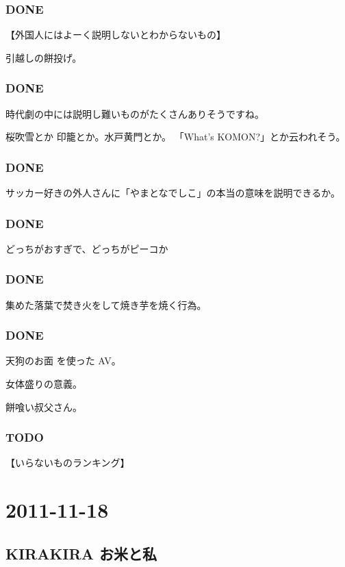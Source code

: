 \documentclass[11pt]{article}
\begin{document}
\subsubsection{\textbf{DONE}}
\label{sec-34_1_2}

【外国人にはよーく説明しないとわからないもの】

引越しの餅投げ。
\subsubsection{\textbf{DONE}}
\label{sec-34_1_3}

時代劇の中には説明し難いものがたくさんありそうですね。

桜吹雪とか
印籠とか。水戸黄門とか。
「What's KOMON?」とか云われそう。
\subsubsection{\textbf{DONE}}
\label{sec-34_1_4}

サッカー好きの外人さんに「やまとなでしこ」の本当の意味を説明できるか。
\subsubsection{\textbf{DONE}}
\label{sec-34_1_5}

どっちがおすぎで、どっちがピーコか
\subsubsection{\textbf{DONE}}
\label{sec-34_1_6}

集めた落葉で焚き火をして焼き芋を焼く行為。
\subsubsection{\textbf{DONE}}
\label{sec-34_1_7}

天狗のお面 を使った AV。

女体盛りの意義。

餅喰い叔父さん。
\subsubsection{\textbf{TODO}}
\label{sec-34_1_8}

【いらないものランキング】
\section{2011-11-18}
\label{sec-35}
\subsection{KIRAKIRA お米と私}
\label{sec-35_1}
\end{document}
